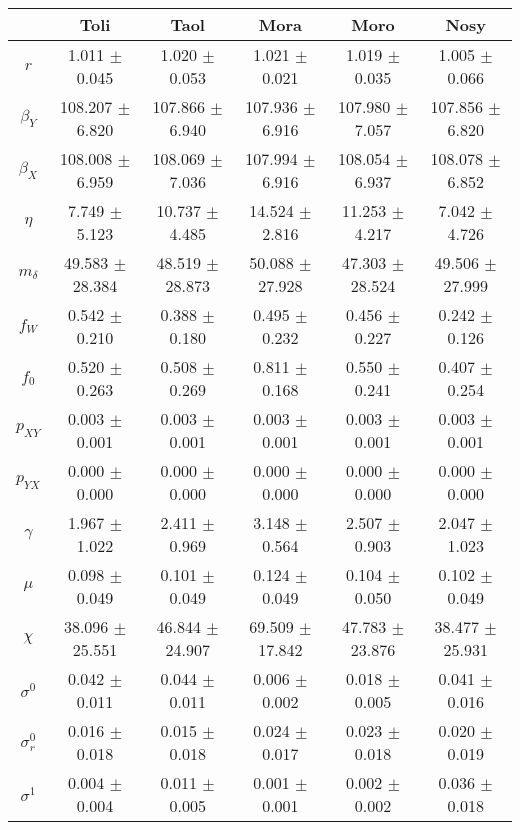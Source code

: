 \begin{sidewaystable}
\centering
\begin{tabular}{cccccc}
 & {\bf Toli} & {\bf Taol} & {\bf Mora} & {\bf Moro} & {\bf Nosy} \\
\hline\hline
{\bf $r$} & 1.011 $\pm$ 0.045 & 1.020 $\pm$ 0.053 & 1.021 $\pm$ 0.021 & 1.019 $\pm$ 0.035 & 1.005 $\pm$ 0.066 \\
{\bf $\beta_Y$} & 108.207 $\pm$ 6.820 & 107.866 $\pm$ 6.940 & 107.936 $\pm$ 6.916 & 107.980 $\pm$ 7.057 & 107.856 $\pm$ 6.820 \\
{\bf $\beta_X$} & 108.008 $\pm$ 6.959 & 108.069 $\pm$ 7.036 & 107.994 $\pm$ 6.916 & 108.054 $\pm$ 6.937 & 108.078 $\pm$ 6.852 \\
{\bf $\eta$} & 7.749 $\pm$ 5.123 & 10.737 $\pm$ 4.485 & 14.524 $\pm$ 2.816 & 11.253 $\pm$ 4.217 & 7.042 $\pm$ 4.726 \\
{\bf $m_{\delta}$} & 49.583 $\pm$ 28.384 & 48.519 $\pm$ 28.873 & 50.088 $\pm$ 27.928 & 47.303 $\pm$ 28.524 & 49.506 $\pm$ 27.999 \\
{\bf $f_W$} & 0.542 $\pm$ 0.210 & 0.388 $\pm$ 0.180 & 0.495 $\pm$ 0.232 & 0.456 $\pm$ 0.227 & 0.242 $\pm$ 0.126 \\
{\bf $f_0$} & 0.520 $\pm$ 0.263 & 0.508 $\pm$ 0.269 & 0.811 $\pm$ 0.168 & 0.550 $\pm$ 0.241 & 0.407 $\pm$ 0.254 \\
{\bf $p_{XY}$} & 0.003 $\pm$ 0.001 & 0.003 $\pm$ 0.001 & 0.003 $\pm$ 0.001 & 0.003 $\pm$ 0.001 & 0.003 $\pm$ 0.001 \\
{\bf $p_{YX}$} & 0.000 $\pm$ 0.000 & 0.000 $\pm$ 0.000 & 0.000 $\pm$ 0.000 & 0.000 $\pm$ 0.000 & 0.000 $\pm$ 0.000 \\
{\bf $\gamma$} & 1.967 $\pm$ 1.022 & 2.411 $\pm$ 0.969 & 3.148 $\pm$ 0.564 & 2.507 $\pm$ 0.903 & 2.047 $\pm$ 1.023 \\
{\bf $\mu$} & 0.098 $\pm$ 0.049 & 0.101 $\pm$ 0.049 & 0.124 $\pm$ 0.049 & 0.104 $\pm$ 0.050 & 0.102 $\pm$ 0.049 \\
{\bf $\chi$} & 38.096 $\pm$ 25.551 & 46.844 $\pm$ 24.907 & 69.509 $\pm$ 17.842 & 47.783 $\pm$ 23.876 & 38.477 $\pm$ 25.931 \\
{\bf $\sigma^0$} & 0.042 $\pm$ 0.011 & 0.044 $\pm$ 0.011 & 0.006 $\pm$ 0.002 & 0.018 $\pm$ 0.005 & 0.041 $\pm$ 0.016 \\
{\bf $\sigma^0_r$} & 0.016 $\pm$ 0.018 & 0.015 $\pm$ 0.018 & 0.024 $\pm$ 0.017 & 0.023 $\pm$ 0.018 & 0.020 $\pm$ 0.019 \\
{\bf $\sigma^1$} & 0.004 $\pm$ 0.004 & 0.011 $\pm$ 0.005 & 0.001 $\pm$ 0.001 & 0.002 $\pm$ 0.002 & 0.036 $\pm$ 0.018 \\

\end{tabular}
\end{sidewaystable}
